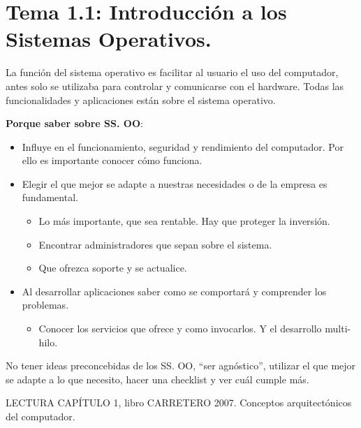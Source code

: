 \documentclass[12pt, twoside, openright]{report} %
\begin{document}
\section{Tema 1.1: Introducción a los Sistemas Operativos.}


  
  La función del sistema operativo es facilitar al usuario el uso del
  computador, antes solo se utilizaba para controlar y comunicarse con
  el hardware. Todas las funcionalidades y aplicaciones están sobre el
  sistema operativo.
  
  
  \textbf{Porque saber sobre SS. OO}:
  

  \begin{itemize}
  \item Influye en el funcionamiento, seguridad y rendimiento del
    computador. Por ello es importante conocer cómo funciona.
    
  \item Elegir el que mejor se adapte a nuestras necesidades o de la empresa
    es fundamental.
    

    \begin{itemize}
    \item Lo más importante, que sea rentable. Hay que proteger la
      inversión.
      
    \item Encontrar administradores que sepan sobre el sistema.
      
    \item Que ofrezca soporte y se actualice.
      
    \end{itemize}
  \item Al desarrollar aplicaciones saber como se comportará y comprender
    los problemas.
    

    \begin{itemize}
    \item Conocer los servicios que ofrece y como invocarlos. Y el
      desarrollo multi-hilo.
      
    \end{itemize}
  \end{itemize}
  
  No tener ideas preconcebidas de los SS. OO, \enquote{ser agnóstico},
  utilizar el que mejor se adapte a lo que necesito, hacer una checklist
  y ver cuál cumple más.
  
  
  LECTURA CAPÍTULO 1, libro CARRETERO 2007. Conceptos arquitectónicos
  del computador.
  
\end{document}
